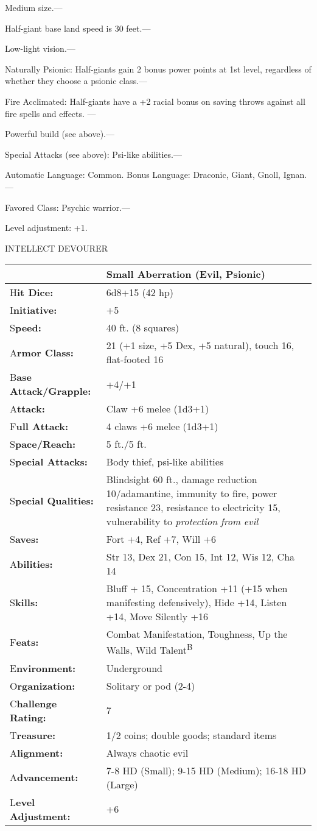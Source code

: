 \documentclass{article}
\begin{document}
\parindent=0pt
Medium size.---

Half-giant base land speed is 30 feet.---

Low-light vision.---

Naturally Psionic: Half-giants gain 2 bonus power points at 1st level, regardless 
of whether they choose a psionic class.---

Fire Acclimated: Half-giants have a +2 racial bonus on saving throws against all 
fire spells and effects. ---

Powerful build (see above).---

Special Attacks (see above): Psi-like abilities.---

Automatic Language: Common. Bonus Language: Draconic, Giant, Gnoll, Ignan.---

Favored Class: Psychic warrior.---

Level adjustment: +1.

\vspace{12pt}
{\LARGE{}INTELLECT DEVOURER}

\begin{tabular}{|>{\raggedright}p{83pt}|>{\raggedright}p{242pt}|}
\hline
  & Small Aberration (Evil, Psionic)\tabularnewline
\hline
H\textbf{it Dice:} & 6d8+15 (42 hp)\tabularnewline
\hline
I\textbf{nitiative:} & +5\tabularnewline
\hline
S\textbf{peed:} & 40 ft. (8 squares)\tabularnewline
\hline
A\textbf{rmor Class:} & 21 (+1 size, +5 Dex, +5 natural), touch 16, flat-footed 
16\tabularnewline
\hline
B\textbf{ase Attack/Grapple:} & +4/+1\tabularnewline
\hline
A\textbf{ttack:} & Claw +6 melee (1d3+1)\tabularnewline
\hline
F\textbf{ull Attack:} & 4 claws +6 melee (1d3+1)\tabularnewline
\hline
S\textbf{pace/Reach:} & 5 ft./5 ft.\tabularnewline
\hline
S\textbf{pecial Attacks:} & Body thief, psi-like abilities\tabularnewline
\hline
S\textbf{pecial Qualities:} & Blindsight 60 ft., damage reduction 10/adamantine, 
immunity to fire, power resistance 23, resistance to electricity 15, vulnerability 
to \textit{protection from evil}\tabularnewline
\hline
S\textbf{aves:} & Fort +4, Ref +7, Will +6\tabularnewline
\hline
A\textbf{bilities:} & Str 13, Dex 21, Con 15, Int 12, Wis 12, Cha 14\tabularnewline
\hline
S\textbf{kills:} & Bluff + 15, Concentration +11 (+15 when manifesting defensively), 
Hide +14, Listen +14, Move Silently +16\tabularnewline
\hline
F\textbf{eats:} & Combat Manifestation, Toughness, Up the Walls, Wild Talent\textsuperscript{B}\tabularnewline
\hline
E\textbf{nvironment:} & Underground\tabularnewline
\hline
O\textbf{rganization:} & Solitary or pod (2-4)\tabularnewline
\hline
C\textbf{hallenge Rating:} & 7\tabularnewline
\hline
T\textbf{reasure:} & 1/2 coins; double goods; standard items\tabularnewline
\hline
A\textbf{lignment:} & Always chaotic evil\tabularnewline
\hline
A\textbf{dvancement:} & 7-8 HD (Small); 9-15 HD (Medium); 16-18 HD (Large)\tabularnewline
\hline
L\textbf{evel Adjustment:} & +6\tabularnewline
\hline
\end{tabular}
\end{document}
